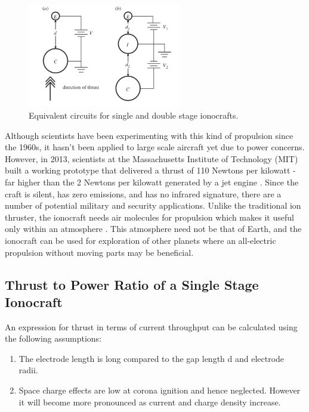 \documentclass[11pt]{article}
\begin{document}
\begin{figure}[h!]
\centering
\includegraphics[width= 0.6\textwidth]{ss_ds}
\caption{\label{fig:ss_ds} Equivalent circuits for single and double stage ionocrafts. \cite{ehdperform}}
\end{figure}

Although scientists have been experimenting with this kind of propulsion since the 1960s, it hasn't been applied to large scale aircraft yet due to power concerns. However, in 2013, scientists at the Massachusetts Institute of Technology (MIT) built a working prototype that delivered a thrust of 110 Newtons per kilowatt - far higher than the 2 Newtons per kilowatt generated by a jet engine \cite{mit}. Since the craft is silent, has zero emissions, and has no infrared signature, there are a number of potential military and security applications. Unlike the traditional ion thruster, the ionocraft needs air molecules for propulsion which makes it useful only within an atmosphere \cite{verge}. This atmosphere need not be that of Earth, and the ionocraft can be used for exploration of other planets where an all-electric propulsion without moving parts may be beneficial.


\subsection{Thrust to Power Ratio of a Single Stage Ionocraft}
\label{tp_ratio}

An expression for thrust in terms of current throughput can be calculated using the following assumptions:

\begin{enumerate}
\item The electrode length is long compared to the gap length d and electrode radii.
\item Space charge effects are low at corona ignition and hence neglected. However it will become more pronounced as current and charge density increase.
\end{enumerate}
\end{document}
